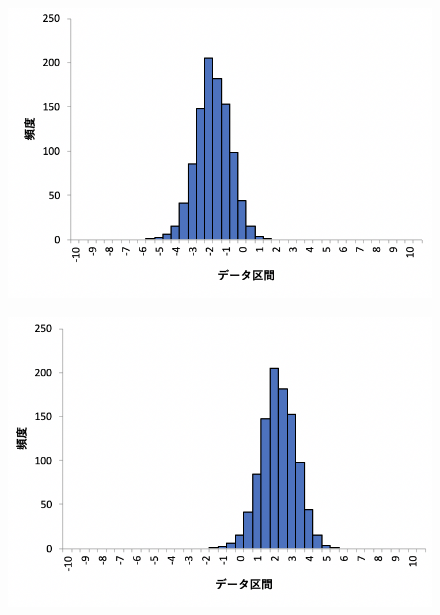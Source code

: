 \documentclass[12pt]{jarticle}
\begin{document}
\clearpage
\begin{figure}[h]
    \begin{center}
        \includegraphics[scale=0.6]{kadai4_3graph2.png}
    \end{center}
    \caption{}
\end{figure}
\begin{figure}[h]
    \begin{center}
        \includegraphics[scale=0.6]{kadai4_3graph3.png}
    \end{center}
    \caption{}
\end{figure}
\end{document}
